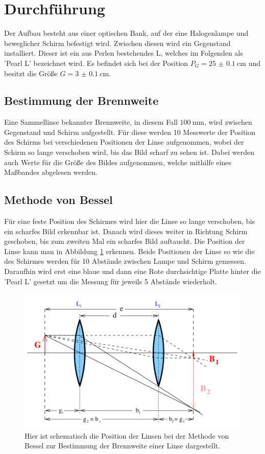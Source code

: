\section{Durchführung}
\label{sec:Durchführung}
Der Aufbau besteht aus einer optischen Bank, auf der eine Halogenlampe und beweglicher Schirm befestigt wird. 
Zwischen diesen wird ein Gegenstand installiert. 
Dieser ist ein aus Perlen bestehendes L, welches im Folgenden als 'Pearl L' bezeichnet wird.
Es befindet sich bei der Position $P_G=\qty{25(0.1)}{\centi\meter}$ und besitzt die Größe $G=\qty{3(0.1)}{\centi\meter}$.

\subsection{Bestimmung der Brennweite}
Eine Sammellinse bekannter Brennweite, in diesem Fall $\qty{100}{\milli\meter}$, wird zwischen Gegenstand und Schirm aufgestellt.
Für diese werden 10 Messwerte der Position des Schirms bei verschiedenen Positionen der Linse aufgenommen, wobei der Schirm so lange verschoben wird, bis das Bild scharf zu sehen ist.
Dabei werden auch Werte für die Größe des Bildes aufgenommen, welche mithilfe eines Maßbandes abgelesen werden.

\subsection{Methode von Bessel}
Für eine feste Position des Schirmes wird hier die Linse so lange verschoben, bis ein scharfes Bild erkennbar ist. 
Danach wird dieses weiter in Richtung Schirm geschoben, bis zum zweiten Mal ein scharfes Bild auftaucht.
Die Position der Linse kann man in Abbildung \ref{fig:Bessel} erkennen.
Beide Positionen der Linse so wie die des Schirmes werden für 10 Abstände zwischen Lampe und Schirm gemessen.
Daraufhin wird erst eine blaue und dann eine Rote durchsichtige Platte hinter die 'Pearl L' gesetzt um die Messung für jeweils 5 Abstände wiederholt.

\begin{figure}
    \includegraphics{../Bilder/Bessel.png}
    \caption{Hier ist schematisch die Position der Linsen bei der Methode von Bessel zur Bestimmung der Brennweite einer Linse dargestellt.}
    \label{fig:Bessel}
\end{figure}


